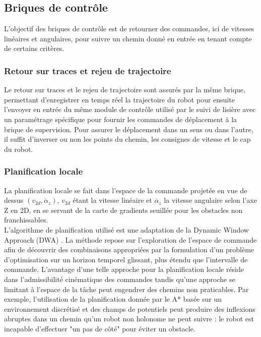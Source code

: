 \subsection{Briques de contrôle}
L'objectif des briques de contrôle est de retourner des commandes, ici de vitesses linéaires et angulaires, pour suivre un chemin donné en entrée en tenant compte de certains critères.

\subsubsection{Retour sur traces et rejeu de trajectoire}
Le retour sur traces et le rejeu de trajectoire sont assurés par la même brique, permettant d'enregistrer en temps réel la trajectoire du robot pour ensuite l'envoyer en entrée du même module de contrôle utilisé par le suivi de lisière avec un paramétrage spécifique pour fournir les commandes de déplacement à la brique de supervision. Pour assurer le déplacement dans un sens ou dans l'autre, il suffit d'inverser ou non les points du chemin, les consignes de vitesse et le cap du robot.







\subsubsection{Planification locale}
La planification locale se fait dans l'espace de la commande projetée en vue de dessus $(v_{2d},\dot{\alpha}_z)$, $v_{2d}$ étant la vitesse linéaire et $\dot{\alpha_z}$ la vitesse angulaire selon l'axe Z en 2D, en se servant de la carte de gradients seuillée pour les obstacles non franchissables.\\

\indent L'algorithme de planification utilisé est une adaptation de la Dynamic Window Approach (DWA) \cite{fox1997dynamic}. La méthode repose sur l'exploration de l'espace de commande afin de découvrir des combinaisons appropriées par la formulation d'un problème d'optimisation sur un horizon temporel glissant, plus étendu que l'intervalle de commande. L'avantage d'une telle approche pour la planification locale réside dans l'admissibilité cinématique des commandes tandis qu'une approche se limitant à l'espace de la tâche peut engendrer des chemins non praticables. Par exemple, l'utilisation de la planification donnée par le A* basée sur un environnement discrétisé et des champs de potentiels peut produire des inflexions abruptes dans un chemin qu'un robot non holonome ne peut suivre : le robot est incapable d'effectuer "un pas de côté" pour éviter un obstacle.\\

